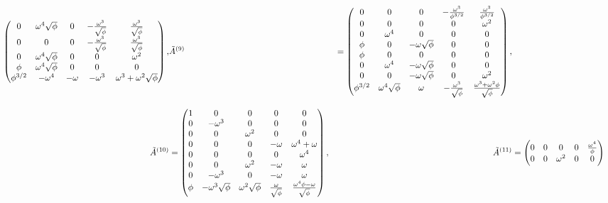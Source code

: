 \begin{align}
\begin{pmatrix}
    0 & \omega^4 \sqrt{\phi} & 0 & -\frac{\omega^3}{\sqrt{\phi}} & \frac{\omega^3}{\sqrt{\phi}} \\
    0 & 0 & 0 & -\frac{\omega^3}{\sqrt{\phi}} & \frac{\omega^3}{\sqrt{\phi}} \\
    0 & \omega^4 \sqrt{\phi} & 0 & 0 & \omega^2 \\
    \phi & \omega^4 \sqrt{\phi} & 0 & 0 & 0 \\
    \phi^{3/2} & -\omega^4 & -\omega & -\omega^3 & \omega^3+\omega^2 \sqrt{\phi} \\
  \end{pmatrix}, &
  \tilde{A}^{(9)} &= \begin{pmatrix}
    0 & 0 & 0 & -\frac{\omega^3}{\phi^{3/2}} & \frac{\omega^3}{\phi^{3/2}} \\
    0 & 0 & 0 & 0 & \omega^2 \\
    0 & \omega^4 & 0 & 0 & 0 \\
    \phi & 0 & -\omega\sqrt{\phi} & 0 & 0 \\
    \phi & 0 & 0 & 0 & 0 \\
    0 & \omega^4 & -\omega\sqrt{\phi} & 0 & 0 \\
    0 & 0 & -\omega\sqrt{\phi} & 0 & \omega^2 \\
    \phi^{3/2} & \omega^4 \sqrt{\phi} & \omega & -\frac{\omega^3}{\sqrt{\phi}} & \frac{\omega^3+\omega^2 \phi}{\sqrt{\phi}} \\
  \end{pmatrix}, \notag \\[2ex]
  \tilde{A}^{(10)} &= \begin{pmatrix}
    1 & 0 & 0 & 0 & 0 \\
    0 & -\omega^3 & 0 & 0 & 0 \\
    0 & 0 & \omega^2 & 0 & 0 \\
    0 & 0 & 0 & -\omega & \omega^4+\omega \\
    0 & 0 & 0 & 0 & \omega^4 \\
    0 & 0 & \omega^2 & -\omega & \omega \\
    0 & -\omega^3 & 0 & -\omega & \omega \\
    \phi & -\omega^3\sqrt{\phi} & \omega^2 \sqrt{\phi} & \frac{\omega}{\sqrt{\phi}} & \frac{\omega^4 \phi-\omega}{\sqrt{\phi}} \\
  \end{pmatrix}, &
  \tilde{A}^{(11)} &= \begin{pmatrix}
    0 & 0 & 0 & 0 & \frac{\omega^4}{\phi} \\
    0 & 0 & \omega^2 & 0 & 0 \\

\end{pmatrix}
\end{align}
